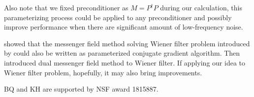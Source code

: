 \documentclass[twocolumn,linenumbers]{aastex631}
\newcommand{\Pdagger}{P^{\dagger}}
\begin{document}
Also note that we fixed preconditioner as $M = \Pdagger P$ during our calculation,
this parameterizing process could be applied to any preconditioner and possibly improve performance when 
there are significant amount of low-frequency noise.

\citet{2018A&A...620A..59P} showed that the messenger field method solving Wiener
filter problem introduced by \cite{2013A&A...549A.111E} could also be written as 
parameterized conjugate gradient algorithm.
Then \citet{2017MNRAS.468.1782K} introduced dual messenger field method to Wiener filter.
If applying our idea to Wiener filter problem, hopefully, it may also bring improvements.













\begin{acknowledgments}
BQ and KH are supported by NSF award 1815887.
\end{acknowledgments}

%



\end{document}
